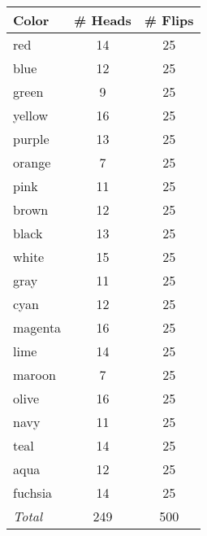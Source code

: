 \documentclass{standalone}
\begin{document}
\begin{tabular}{lcc}
\toprule 
\toprule
Color & \# Heads  & \# Flips\\
\midrule
red & 14 & 25 \\
blue & 12 & 25 \\
green & 9 & 25 \\
yellow & 16 & 25 \\
purple & 13 & 25 \\
orange & 7 & 25 \\
pink & 11 & 25 \\
brown & 12 & 25 \\
black & 13 & 25 \\
white & 15 & 25 \\
gray & 11 & 25 \\
cyan & 12 & 25 \\
magenta & 16 & 25 \\
lime & 14 & 25 \\
maroon & 7 & 25 \\
olive & 16 & 25 \\
navy & 11 & 25 \\
teal & 14 & 25 \\
aqua & 12 & 25 \\
fuchsia & 14 & 25 \\
\midrule
\emph{Total} & 249 & 500 \\
\bottomrule
\bottomrule
\end{tabular}
\end{document}
